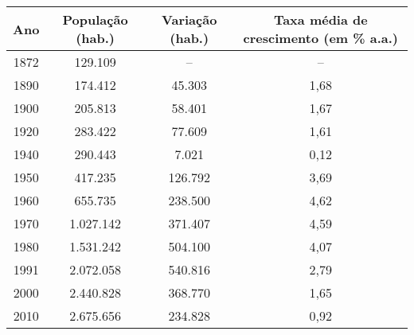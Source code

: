 \begin{table}[!htp]
\centering
{}
{\begin{tabular}{cccc}
\hline 
Ano & População (hab.) & Variação (hab.) & Taxa média de crescimento (em \% a.a.) \\ 
\hline\hline
1872 & 129.109 & -- & -- \\ 
1890 & 174.412 & 45.303 & 1,68 \\ 
1900 & 205.813 & 58.401 & 1,67 \\ 
1920 & 283.422 & 77.609 & 1,61 \\ 
1940 & 290.443 & 7.021 & 0,12 \\ 
1950 & 417.235 & 126.792 & 3,69\\
1960 & 655.735 & 238.500 & 4,62\\
1970 & 1.027.142 & 371.407 & 4,59\\
1980 & 1.531.242 & 504.100 & 4,07\\
1991 & 2.072.058 & 540.816 & 2,79\\
2000 & 2.440.828 & 368.770 & 1,65\\
2010 & 2.675.656 & 234.828 & 0,92\\
\hline 
\end{tabular} }{
}
\end{table}